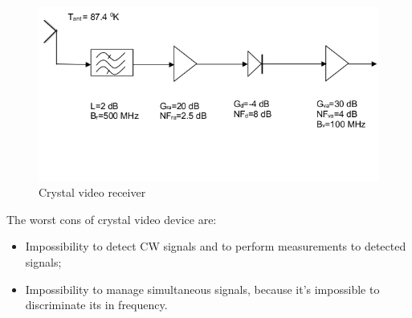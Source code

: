 \documentclass[12pt]{report}
\begin{document}
\begin{figure}[h!]
    \centering
    \includegraphics[width=12cm]{Pictures/Crystal video receiver.png}
    \caption{Crystal video receiver}
\end{figure}

The worst cons of  crystal video device are:
\begin{itemize}
         \item Impossibility to detect CW signals and to perform measurements to detected signals;
         \item Impossibility to manage simultaneous signals, because it's impossible to discriminate its in frequency.
\end{itemize}
 
\end{document}
